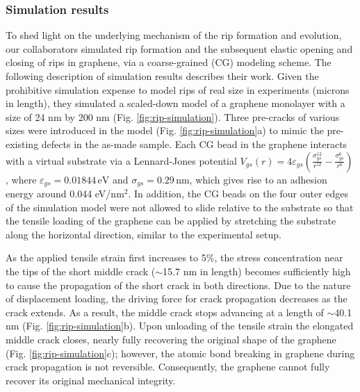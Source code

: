\documentclass[edeposit,fullpage,draftthesis]{uiucthesis2009}
\begin{document}
        \subsubsection*{Simulation results}
        
        To shed light on the underlying mechanism of the rip formation and evolution,
        our collaborators simulated rip formation and the subsequent elastic opening and closing of
        rips in graphene, via a coarse-grained (CG) modeling scheme\cite{Zhu2014}.
        The following description of simulation results describes their work.
        Given the prohibitive simulation expense to model rips of real size in
        experiments (microns in length), they simulated a scaled-down model of a graphene
        monolayer with a size of 24 nm by 200 nm (Fig. \ref{fig:rip-simulation}). Three pre-cracks of various
        sizes were introduced in the model (Fig. \ref{fig:rip-simulation}a) to mimic the pre-existing defects
        in the as-made sample. Each CG bead in the graphene interacts with a virtual
        substrate via a Lennard-Jones potential\cite{Scharfenberg2011} $V_{gs}(r)
        =4\varepsilon_{gs} \left( \frac{\sigma_{gs}^{12}}{r^{12}} -
        \frac{\sigma_{gs}^6}{r^6} \right)$, where $\varepsilon_{gs}=0.01844 \,
        \text{eV}$ and $\sigma_{gs}=0.29 \, \text{nm}$, which gives rise to an adhesion
        energy around 0.044 eV/nm$^{2}$. In addition, the CG beads on the four outer
        edges of the simulation model were not allowed to slide relative to the
        substrate so that the tensile loading of the graphene can be applied by
        stretching the substrate along the horizontal direction, similar to the
        experimental setup.
        
        As the applied tensile strain first increases to 5\%, the stress concentration
        near the tips of the short middle crack ($\sim$15.7 nm in length) becomes
        sufficiently high to cause the propagation of the short crack in both
        directions. Due to the nature of displacement loading, the driving force for
        crack propagation decreases as the crack extends. As a result, the middle crack
        stops advancing at a length of $\sim$40.1 nm (Fig. \ref{fig:rip-simulation}b). Upon unloading of the
        tensile strain the elongated middle crack closes, nearly fully recovering the
        original shape of the graphene (Fig. \ref{fig:rip-simulation}c); however, the atomic bond breaking in
        graphene during crack propagation is not reversible. Consequently, the graphene
        cannot fully recover its original mechanical integrity.
        
\end{document}

